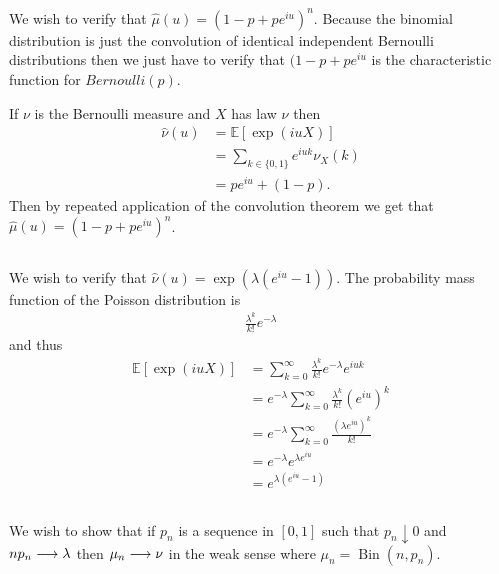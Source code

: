 \documentclass{unswmaths}
\begin{document}
\subsection{}
We wish to verify that $ \hat{\mu}(u) = (1 - p + pe^{iu})^n $. 
Because the binomial distribution is just the convolution of identical independent Bernoulli distributions then we just have to verify that $ (1 - p + pe^{iu} $ is the characteristic function for $Bernoulli(p)$.

If $ \nu $ is the Bernoulli measure and $ X $ has law $ \nu $ then 
\begin{align}
	\hat{\nu}(u) &= \mathbb{E}[ \exp(iuX)] \\
		&= \sum_{k \in \{ 0, 1\}} e^{iuk} \nu_{X}(k) \\
		&=  pe^{iu} + (1 - p).
\end{align}
Then by repeated application of the convolution theorem we get that
$ \hat{\mu}(u) = (1 - p + pe^{iu})^n $.

\subsection{}
We wish to verify that $ \hat{\nu}(u) = \exp(\lambda(e^{iu} - 1)) $. 
The probability mass function of the Poisson distribution is 
\begin{align}
	\frac{\lambda^k}{k!} e^{-\lambda} 
\end{align}
and thus
\begin{align}
	\mathbb{E}[ \exp(iuX) ] &= \sum_{k=0}^\infty \frac{\lambda^k}{k!} e^{-\lambda} e^{iuk} \\
		&= e^{-\lambda}\sum_{k=0}^\infty \frac{\lambda^k}{k!} (e^{iu})^k \\
		&= e^{-\lambda}\sum_{k=0}^\infty \frac{(\lambda e^{iu})^k}{k!} \\
		&= e^{-\lambda} e^{\lambda e^{iu}} \\
		&= e^{\lambda( e^{iu} - 1)}
\end{align}

\subsection{}

We wish to show that if $ p_n $ is a sequence in $ [0,1] $ such that $ p_n \downarrow 0 $ and $ np_n \longrightarrow \lambda $ then $ \mu_n \longrightarrow \nu $ in the weak sense where $ \mu_n = \operatorname{Bin}(n, p_n) $.
\end{document}
